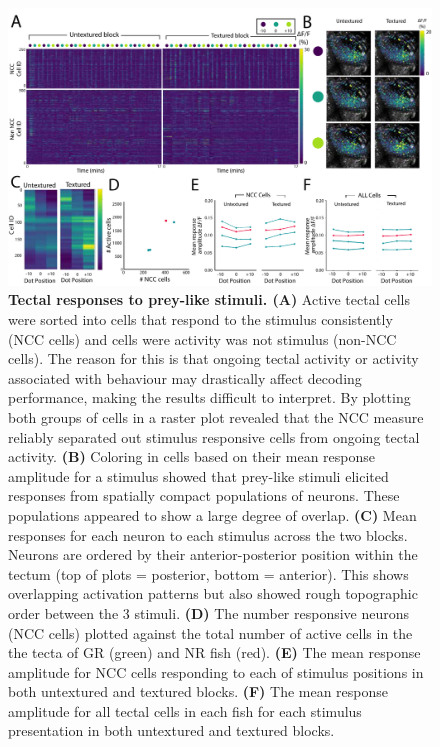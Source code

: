 \begin{figure}[!ht]
        \captionsetup{}
        \centering
        \includegraphics[width =  0.75\paperwidth]{Figures/R3_F2.pdf}
       \caption[\label{fig:R3_F2} \textbf{Tectal responses to prey-like stimuli.}]{\label{fig:R3_F2} \textbf{Tectal responses to prey-like stimuli. (A)} Active tectal cells were sorted into cells that respond to the stimulus consistently (NCC cells) and cells were activity was not stimulus (non-NCC cells). The reason for this is that ongoing tectal activity or activity associated with behaviour may drastically affect decoding performance, making the results difficult to interpret. By plotting both groups of cells in a raster plot revealed that the NCC measure reliably separated out stimulus responsive cells from ongoing tectal activity. \textbf{(B)} Coloring in cells based on their mean response amplitude for a stimulus showed that prey-like stimuli elicited responses from spatially compact populations of neurons. These populations appeared to show a large degree of overlap. \textbf{(C)} Mean responses for each neuron to each stimulus across the two blocks.  Neurons are ordered by their anterior-posterior position within the tectum (top of plots = posterior, bottom = anterior). This shows overlapping activation patterns but also showed rough topographic order between the 3 stimuli. \textbf{(D)} The number responsive neurons (NCC cells) plotted against the total number of active cells in the the tecta of GR (green) and NR fish (red).  \textbf{(E)} The mean response amplitude for NCC cells responding to each of stimulus positions in both untextured and textured blocks. \textbf{(F)} The mean response amplitude for all tectal cells in each fish for each stimulus presentation in both untextured and textured blocks. 
    }
\end{figure}

